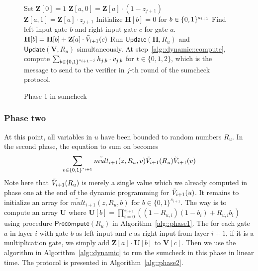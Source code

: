 \begin{figure}[ht!]
	\begin{algorithm}[H]
		\caption{Phase 1 in sumcheck}\label{alg::phase1}
		\begin{algorithmic}[1]
			\State Set $\textbf{Z}[0] = 1$
				\State $\textbf{Z}[a,0] = \textbf{Z}[a]\cdot(1-z_{j+1})$
				\State $\textbf{Z}[a,1] = \textbf{Z}[a]\cdot z_{j+1}$
				\EndFor
			\EndFor
			\EndProcedure
			\State Initialize $\textbf{H}[b] = 0$ for $b\in\{0,1\}^{s_{i+1}}$
			\State Find left input gate $b$ and right input gate $c$ for gate $a$. 
			\State\label{alg::phase1::init} $\textbf{H}[b] = \textbf{H}[b]+ \textbf{Z}[a]\cdot\tilde{V}_{i+1}(c)$
			\EndFor
			\EndProcedure
			\State Run $\mathsf{Update}(\textbf{H},R_u)$ and $\mathsf{Update}(\textbf{V},R_u)$ simultaneously. At step~\ref{alg::dynamic::compute}, compute $\sum_{b\in\{0,1\}^{s_{i+1}-j}}h_{j,b}\cdot v_{j,b}$ for $t\in\{0,1,2\}$, which is the message to send to the verifier in $j$-th round of the sumcheck protocol.
			\EndProcedure
		\end{algorithmic}
	\end{algorithm}
\end{figure}

\subsubsection{Phase two}

At this point, all variables in $u$ have been bounded to random numbers $R_u$. In the second phase, the equation to sum on becomes 
\[
\sum_{v\in\{0,1\}^{s_{i+1}}}\tilde{mult}_{i+1}(z,R_u,v)\tilde{V}_{i+1}(R_u)\tilde{V}_{i+1}(v)
\]
Note here that $\tilde{V}_{i+1}(R_u)$ is merely a single value which we already computed in phase one at the end of the dynamic programming for $\tilde{V}_{i+1}(u)$. It remains to initialize an array for $\tilde{mult}_{i+1}(z,R_u,b)$ for $b\in\{0,1\}^{s_{i+1}}$. The way is to compute an array \textbf{U} where $\textbf{U}[b] = \prod_{i=0}^{s_{i+1}} ((1-R_{u,i})(1-b_i)+R_{u,i}b_i)$ using procedure $\mathsf{Precompute}(R_u)$ in Algorithm~\ref{alg::phase1}. The for each gate $a$ in layer $i$ with gate $b$ as left input and $c$ as right input from layer $i+1$, if it is a multiplication gate, we simply add $\textbf{Z}[a]\cdot\textbf{U}[b]$ to $\textbf{V}[c]$. Then we use the algorithm in Algorithm~\ref{alg::dynamic} to run the sumcheck in this phase in linear time. The protocol is presented in Algorithm~\ref{alg::phase2}.


